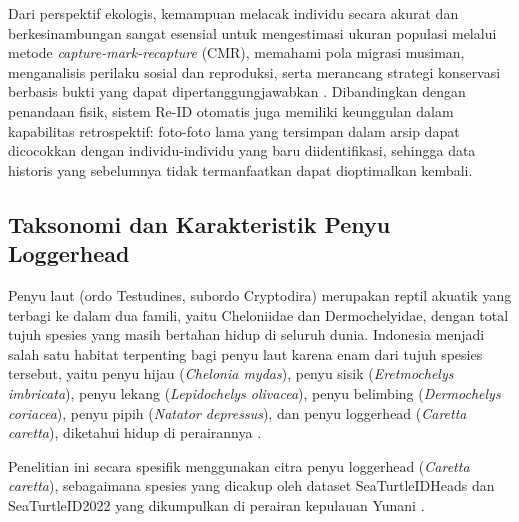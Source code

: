 Dari perspektif ekologis, kemampuan melacak individu secara akurat dan berkesinambungan sangat esensial untuk mengestimasi ukuran populasi melalui metode \textit{capture-mark-recapture} (CMR), memahami pola migrasi musiman, menganalisis perilaku sosial dan reproduksi, serta merancang strategi konservasi berbasis bukti yang dapat dipertanggungjawabkan \cite{clapham2021perspectives}. Dibandingkan dengan penandaan fisik, sistem Re-ID otomatis juga memiliki keunggulan dalam kapabilitas retrospektif: foto-foto lama yang tersimpan dalam arsip dapat dicocokkan dengan individu-individu yang baru diidentifikasi, sehingga data historis yang sebelumnya tidak termanfaatkan dapat dioptimalkan kembali.
 

\subsection{Taksonomi dan Karakteristik Penyu Loggerhead}
\label{subsec:taksonomi-penyu}


Penyu laut (ordo Testudines, subordo Cryptodira) merupakan reptil akuatik yang
terbagi ke dalam dua famili, yaitu Cheloniidae dan Dermochelyidae, dengan total
tujuh spesies yang masih bertahan hidup di seluruh dunia. Indonesia menjadi
salah satu habitat terpenting bagi penyu laut karena enam dari tujuh spesies
tersebut, yaitu penyu hijau (\textit{Chelonia mydas}), penyu sisik
(\textit{Eretmochelys imbricata}), penyu lekang (\textit{Lepidochelys
olivacea}), penyu belimbing (\textit{Dermochelys coriacea}), penyu pipih
(\textit{Natator depressus}), dan penyu loggerhead (\textit{Caretta caretta}),
diketahui hidup di perairannya \cite{ario2016}.

Penelitian ini secara spesifik menggunakan citra penyu loggerhead
(\textit{Caretta caretta}), sebagaimana spesies yang dicakup oleh dataset
SeaTurtleIDHeads dan SeaTurtleID2022 yang dikumpulkan di perairan kepulauan
Yunani \cite{adam2023seaturtle}.

